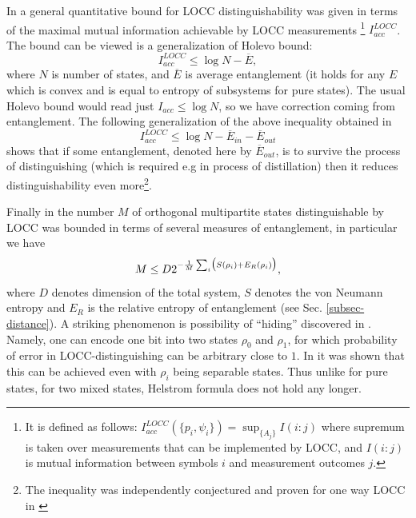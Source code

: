 \documentclass[rmp,12pt,preprint]{revtex4-2}
\begin{document}
In \cite{Badziag-Holevo} a general quantitative bound for LOCC distinguishability
was given in terms of the maximal mutual information achievable by LOCC measurements
\footnote{It is defined as follows:
$I_{acc}^{LOCC}(\{p_i,\psi_i\})=\sup_{\{A_j\}}I(i:j)$ where
supremum is taken over measurements that can be implemented by LOCC, and $I(i:j)$
is mutual information between symbols $i$ and measurement outcomes $j$.}  $I^{LOCC}_{acc}$.
The bound can be viewed is a generalization of Holevo bound:
\begin{equation}
I_{acc}^{LOCC} \leq \log N- \overline E,
\end{equation}
where $N$ is number of states, and $\overline E$ is average
entanglement (it holds for any $E$ which is convex and is equal to
entropy of subsystems for pure states).  The usual Holevo bound would
read just $I_{acc}\leq \log N$, so we have correction coming from
entanglement. The following generalization of the above inequality
obtained in \cite{HorodeckiOSS-dist}
\begin{equation}
I_{acc}^{LOCC} \leq \log N-\overline E_{in} -\overline E_{out}
\end{equation}
shows that if some entanglement, denoted here by $\overline E_{out}$,
is to survive the process of distinguishing (which is required e.g in
process of distillation) then it reduces distinguishability
even more\footnote{The inequality was independently
conjectured and proven for one way LOCC in \cite{Ghosh2004-locc-acc}}.

Finally in \cite{HayashiMMOV-LOCCdist} the number $M$ of orthogonal
multipartite states distinguishable by LOCC was bounded in terms of
several measures of entanglement, in particular we have
\begin{equation}
M \leq D 2^{-{1\over M}\sum_i \bigl(S(\rho_i)+E_R(\rho_i)\bigr)},
\label{eq:locc-dist-jap}
\end{equation}
where $D$ denotes dimension of the total system, $S$ denotes the von Neumann entropy and $E_R$ is the relative entropy of entanglement (see Sec. \ref{subsec-distance}).
A striking phenomenon is possibility of ``hiding'' discovered in
\cite{hiding-prl,hiding-ieee}.  Namely, one can encode one bit into
two states $\rho_0$ and $\rho_1$, for which probability of error in
LOCC-distinguishing can be arbitrary close to $1$. In
\cite{WernerHide} it was shown that this can be achieved even with
$\rho_i$ being separable states.  Thus unlike for pure states, for two
mixed states, Helstrom formula does not hold any longer.
\end{document}
